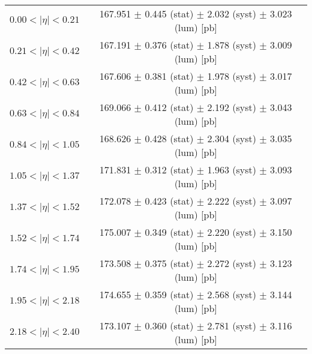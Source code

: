 \begin{tabular}{lc}
\hline
$0.00 < |\eta| <0.21$          & 167.951 $\pm$ 0.445 (stat) $\pm$ 2.032 (syst) $\pm$ 3.023 (lum) [pb]  \\
$0.21 < |\eta| <0.42$          & 167.191 $\pm$ 0.376 (stat) $\pm$ 1.878 (syst) $\pm$ 3.009 (lum) [pb]  \\
$0.42 < |\eta| <0.63$          & 167.606 $\pm$ 0.381 (stat) $\pm$ 1.978 (syst) $\pm$ 3.017 (lum) [pb]  \\
$0.63 < |\eta| <0.84$          & 169.066 $\pm$ 0.412 (stat) $\pm$ 2.192 (syst) $\pm$ 3.043 (lum) [pb]  \\
$0.84 < |\eta| <1.05$          & 168.626 $\pm$ 0.428 (stat) $\pm$ 2.304 (syst) $\pm$ 3.035 (lum) [pb]  \\
$1.05 < |\eta| <1.37$          & 171.831 $\pm$ 0.312 (stat) $\pm$ 1.963 (syst) $\pm$ 3.093 (lum) [pb]  \\
$1.37 < |\eta| <1.52$          & 172.078 $\pm$ 0.423 (stat) $\pm$ 2.222 (syst) $\pm$ 3.097 (lum) [pb]  \\
$1.52 < |\eta| <1.74$          & 175.007 $\pm$ 0.349 (stat) $\pm$ 2.220 (syst) $\pm$ 3.150 (lum) [pb]  \\
$1.74 < |\eta| <1.95$          & 173.508 $\pm$ 0.375 (stat) $\pm$ 2.272 (syst) $\pm$ 3.123 (lum) [pb]  \\
$1.95 < |\eta| <2.18$          & 174.655 $\pm$ 0.359 (stat) $\pm$ 2.568 (syst) $\pm$ 3.144 (lum) [pb]  \\
$2.18 < |\eta| <2.40$          & 173.107 $\pm$ 0.360 (stat) $\pm$ 2.781 (syst) $\pm$ 3.116 (lum) [pb]  \\
\hline
\end{tabular}
